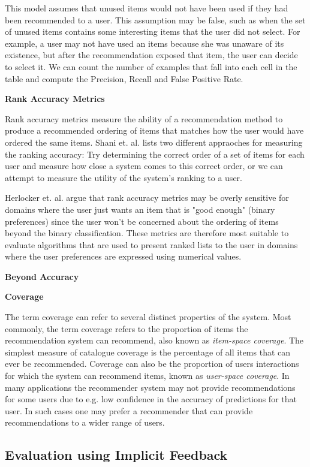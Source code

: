 This model assumes that unused items would not have been used if they had been recommended to a user. This assumption may be false, such as when the set of unused items contains some interesting items that the user did not select. For example, a user may not have used an items because she was unaware of its existence, but after the recommendation exposed that item, the user can decide to select it. We can count the number of examples that fall into each cell in the table and compute the Precision, Recall and False Positive Rate.

\textbf{Rank Accuracy Metrics}

Rank accuracy metrics measure the ability of a recommendation method to produce a recommended ordering of items that matches how the user would have ordered the same items. Shani et. al. \cite{Shani2011} lists two different appraoches for measuring the ranking accuracy: Try determining the correct order of a set of items for each user and measure how close a system comes to this correct order, or we can attempt to measure the utility of the system's ranking to a user.

Herlocker et. al. \cite{Herlocker2004} argue that rank accuracy metrics may be overly sensitive for domains where the user just wants an item that is "good enough" (binary preferences) since the user won't be concerned about the ordering of items beyond the binary classification. These metrics are therefore most suitable to evaluate algorithms that are used to present ranked lists to the user in domains where the user preferences are expressed using numerical values.

\textbf{Beyond Accuracy}

\textbf{Coverage}

The term coverage can refer to several distinct properties of the system. Most commonly, the term coverage refers to the proportion of items the recommendation system can recommend, also known as \emph{item-space coverage}. The simplest measure of catalogue coverage is the percentage of all items that can ever be recommended. Coverage can also be the proportion of users interactions for which the system can recommend items, known as \emph{user-space coverage}. In many applications the recommender system may not provide recommendations for some users due to e.g. low confidence in the accuracy of predictions for that user. In such cases one may prefer a recommender that can provide recommendations to a wider range of users.

\subsection{Evaluation using Implicit Feedback}

